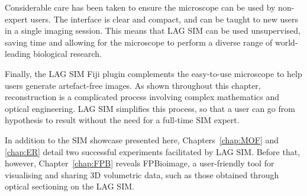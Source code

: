 Considerable care has been taken to ensure the microscope can be used by non-expert users. 
The interface is clear and compact, and can be taught to new users in a single imaging session. 
This means that LAG SIM can be used unsupervised, saving time and allowing for the microscope to perform a diverse range of world-leading biological research.

Finally, the LAG SIM Fiji plugin complements the easy-to-use microscope to help users generate artefact-free images. 
As shown throughout this chapter, reconstruction is a complicated process involving complex mathematics and optical engineering. 
LAG SIM simplifies this process, so that a user can go from hypothesis to result without the need for a full-time SIM expert. 

In addition to the SIM showcase presented here, Chapters~\ref{chap:MOF} and \ref{chap:ER} detail two successful experiments facilitated by LAG SIM. 
Before that, however, Chapter~\ref{chap:FPB} reveals FPBioimage, a user-friendly tool for visualising and sharing 3D volumetric data, such as those obtained through optical sectioning on the LAG SIM. 
